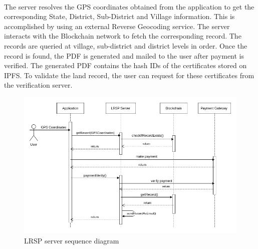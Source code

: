 \documentclass{article}
\begin{document}
        \paragraph{}
        The server resolves the GPS coordinates obtained from the application to get the corresponding State, District, Sub-District and Village information. This is accomplished by using an external Reverse Geocoding service. The server interacts with the Blockchain network to fetch the corresponding record. The records are queried at village, sub-district and district levels in order. Once the record is found, the PDF is generated and mailed to the user after payment is verified. The generated PDF contains the hash IDs of the certificates stored on IPFS. To validate the land record, the user can request for these certificates from the verification server.
        \begin{figure}[H]
                \includegraphics[scale=0.5]{lrsp_seq.png}
                \centering
                \caption{LRSP server sequence diagram}
        \end{figure}
        
\end{document}
